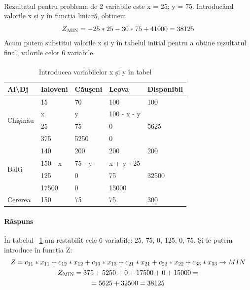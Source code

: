 \paragraph{}
Rezultatul pentru problema de 2 variabile este x = 25; y = 75. Introducând valorile x și y în funcția liniară, obținem
\begin{equation*}
	Z\textsubscript{MIN} = -25 * 25 - 30 * 75 + 41000 = 38125 \\\end{equation*}
Acum putem substitui valorile x și y în tabelul inițial pentru a obține rezultatul final, valorile celor 6 variabile.

\paragraph{}
\begin{table}[h]
\captionsetup{singlelinecheck = false, justification=raggedright}
\caption{Introducea variabilelor x și y în tabel}
\label{tab:variabile_min} 
\begin{center}
\begin{tabular}{|l|l|l|l|l|} 
\hline
Ai\textbackslash{}Dj& Ialoveni & Căușeni & Leova & Disponibil\\ 
\hline
\multirow{4}{*}{Chișinău} & 15 & 70& 100 & 100 \\ 
\cline{2-5}
& x& y & 100 - x - y & \multirow{3}{*}{5625} \\
& 25 & 75& 0& \\
& 375 & 5250& 0& \\ 
\hline
\multirow{4}{*}{Bălți}& 140& 200 & 200 & 200 \\ 
\cline{2-5}
& 150 - x& 75 - y& x + y - 25& \multirow{3}{*}{32500}\\
& 125& 0& 75 & \\
& 17500& 0 & 15000 & \\ 
\hline
Cererea & 150& 75& 75& 300 \\
\hline
\end{tabular}
\end{center}
\end{table}

\paragraph{Răspuns }
În tabelul ~\ref{tab:variabile_min} am restabilit cele 6 variabile: 25, 75, 0, 125, 0, 75. Și le putem introduce în funcția Z:
\begin{gather*}
	Z= 
	c\textsubscript{11} * x\textsubscript{11} +  
	c\textsubscript{12} * x\textsubscript{12} +  
	c\textsubscript{13} * x\textsubscript{13} +  
	c\textsubscript{21} * x\textsubscript{21} +  
	c\textsubscript{22} * x\textsubscript{22} +  
	c\textsubscript{33} * x\textsubscript{33}  \rightarrow MIN  \\
Z\textsubscript{MIN} = 375 + 5250 + 0 + 17500 + 0 + 15000 = \\
= 5625 + 32500 = 38125
\end{gather*}
